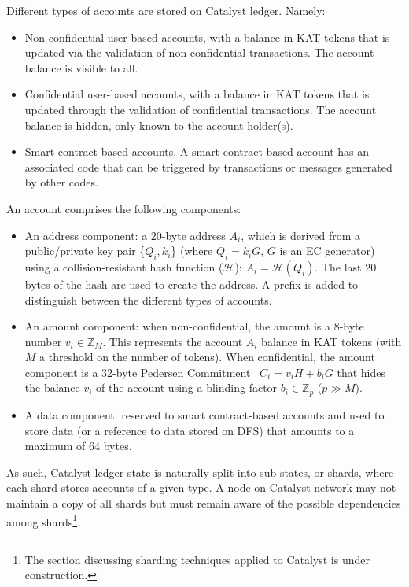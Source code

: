 Different types of accounts  are stored on Catalyst ledger. Namely:

\begin{itemize}
\item Non-confidential user-based accounts, with a balance in KAT tokens that is updated via the validation of non-confidential transactions. The account balance is visible to all.
\item Confidential user-based accounts, with a balance in KAT tokens that is updated through the validation of confidential transactions. The account balance is hidden, only known to the account holder(s).
\item Smart contract-based accounts. A smart contract-based account has an associated code that can be triggered by transactions or messages generated by other codes.
\end{itemize}

An account comprises the following components: 

\begin{itemize}
\item An address component: a 20-byte address $A_{i}$, which is derived from a public/private key pair \{$Q_{i},k_{i}$\} (where $Q_i= k_{i}G$, $G$ is an EC generator) using a collision-resistant hash function ($\mathcal{H}$): $A_{i} = \mathcal{H}(Q_{i})$. The last 20 bytes of the hash are used to create the address. A prefix is added to distinguish between the different types of accounts.  
\item An amount component: when non-confidential, the amount is a 8-byte number $v_{i} \in \mathbb{Z}_M$. This represents the account $A_{i}$ balance in KAT tokens (with $M$ a threshold on the number of tokens). When confidential, the amount component is a 32-byte Pedersen Commitment~\cite{confidential} $C_{i} = v_{i}H + b_{i}G$ that hides the balance $v_i$ of the account using a blinding factor $b_{i} \in  \mathbb{Z}_p$ ($p \gg M$).
\item A data component: reserved to smart contract-based accounts and used to store data (or a reference to data stored on DFS) that amounts to a maximum of 64 bytes. 
\end{itemize}

As such, Catalyst ledger state is naturally split into sub-states, or shards, where each shard stores accounts of a given type. A node on Catalyst network may not maintain a copy of all shards but must remain aware of the possible dependencies among shards\footnote{The section discussing sharding techniques applied to Catalyst is under construction.}.%